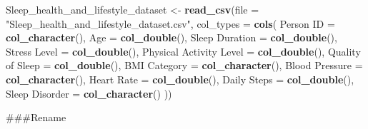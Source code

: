 \documentclass[
  11pt,
]{article}
\newenvironment{Shaded}{\begin{snugshade}}{\end{snugshade}}
\newcommand{\AttributeTok}[1]{\textcolor[rgb]{0.13,0.29,0.53}{#1}}
\newcommand{\FunctionTok}[1]{\textcolor[rgb]{0.13,0.29,0.53}{\textbf{#1}}}
\newcommand{\NormalTok}[1]{#1}
\newcommand{\OtherTok}[1]{\textcolor[rgb]{0.56,0.35,0.01}{#1}}
\newcommand{\StringTok}[1]{\textcolor[rgb]{0.31,0.60,0.02}{#1}}
\begin{document}
\begin{Shaded}
\begin{Highlighting}[]
\NormalTok{Sleep\_health\_and\_lifestyle\_dataset }\OtherTok{\textless{}{-}} \FunctionTok{read\_csv}\NormalTok{(}\AttributeTok{file =} \StringTok{"Sleep\_health\_and\_lifestyle\_dataset.csv"}\NormalTok{,}
  \AttributeTok{col\_types =} \FunctionTok{cols}\NormalTok{(}
    \StringTok{\textquotesingle{}Person ID\textquotesingle{}} \OtherTok{=} \FunctionTok{col\_character}\NormalTok{(),}
    \StringTok{\textquotesingle{}Age\textquotesingle{}} \OtherTok{=} \FunctionTok{col\_double}\NormalTok{(),}
    \StringTok{\textquotesingle{}Sleep Duration\textquotesingle{}} \OtherTok{=} \FunctionTok{col\_double}\NormalTok{(),}
    \StringTok{\textquotesingle{}Stress Level\textquotesingle{}} \OtherTok{=} \FunctionTok{col\_double}\NormalTok{(),}
    \StringTok{\textquotesingle{}Physical Activity Level\textquotesingle{}} \OtherTok{=} \FunctionTok{col\_double}\NormalTok{(),}
    \StringTok{\textquotesingle{}Quality of Sleep\textquotesingle{}} \OtherTok{=} \FunctionTok{col\_double}\NormalTok{(),}
    \StringTok{\textquotesingle{}BMI Category\textquotesingle{}} \OtherTok{=} \FunctionTok{col\_character}\NormalTok{(),}
    \StringTok{\textquotesingle{}Blood Pressure\textquotesingle{}} \OtherTok{=} \FunctionTok{col\_character}\NormalTok{(),}
    \StringTok{\textquotesingle{}Heart Rate\textquotesingle{}} \OtherTok{=} \FunctionTok{col\_double}\NormalTok{(),}
    \StringTok{\textquotesingle{}Daily Steps\textquotesingle{}} \OtherTok{=} \FunctionTok{col\_double}\NormalTok{(),}
    \StringTok{\textquotesingle{}Sleep Disorder\textquotesingle{}} \OtherTok{=} \FunctionTok{col\_character}\NormalTok{()}
\NormalTok{  ))}
\end{Highlighting}
\end{Shaded}

\#\#\#Rename
\end{document}
